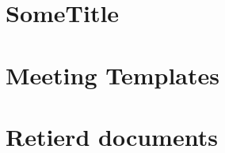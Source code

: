 \documentclass{article}
\begin{document}
\renewcommand{\thepage}{\roman{page}}




\newpage
\setcounter{page}{1}
\renewcommand{\thepage}{\arabic{page}}

\newpage


\newpage


\newpage


\newpage


\newpage


\newpage


\newpage


\newpage



\appendix

\newpage
\section{SomeTitle}

\newpage


\newpage


\newpage
\section{Meeting Templates}

\newpage


\newpage
\section{Retierd documents}

\newpage

\end{document}
